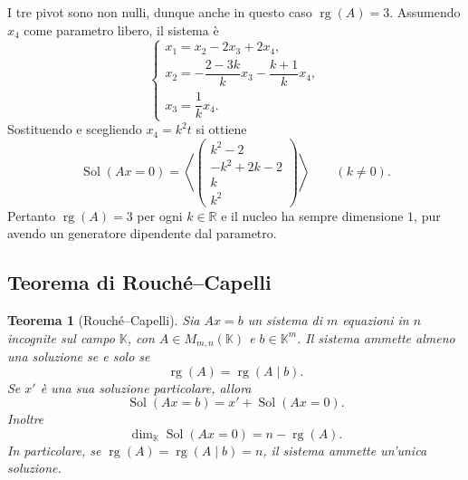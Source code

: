 \documentclass[11pt,a4paper]{article}
\newcommand{\RR}{\mathbb{R}}
\newcommand{\KK}{\mathbb{K}}
\theoremstyle{plain}
\newtheorem{teo}[prop]{Teorema}
\theoremstyle{definition}
\theoremstyle{remark}
\begin{document}
I tre pivot sono non nulli, dunque anche in questo caso $\operatorname{rg}(A)=3$. Assumendo $x_4$ come parametro libero, il sistema è
\[
 \begin{cases}
 x_1=x_2-2x_3+2x_4,\\
 x_2=-\dfrac{2-3k}{k}x_3-\dfrac{k+1}{k}x_4,\\
 x_3=\dfrac1k x_4.
 \end{cases}
\]
Sostituendo e scegliendo $x_4=k^2t$ si ottiene
\[
 \operatorname{Sol}(Ax=0)=\left\langle
 \begin{pmatrix}k^2-2\\-k^2+2k-2\\k\\k^2\end{pmatrix}
 \right\rangle\qquad(k\ne0).
\]
Pertanto $\operatorname{rg}(A)=3$ per ogni $k\in\RR$ e il nucleo ha sempre dimensione $1$, pur avendo un generatore dipendente dal parametro.

\subsection{Teorema di Rouché--Capelli}
\begin{teo}[Rouché--Capelli]
Sia $Ax=b$ un sistema di $m$ equazioni in $n$ incognite sul campo $\KK$, con $A\in M_{m,n}(\KK)$ e $b\in\KK^m$. Il sistema ammette almeno una soluzione se e solo se
\[
 \operatorname{rg}(A)=\operatorname{rg}(A\mid b).
\]
Se $x'$ è una sua soluzione particolare, allora
\[
 \operatorname{Sol}(Ax=b)=x'+\operatorname{Sol}(Ax=0).
\]
Inoltre
\[
 \dim_{\KK}\operatorname{Sol}(Ax=0)=n-\operatorname{rg}(A).
\]
In particolare, se $\operatorname{rg}(A)=\operatorname{rg}(A\mid b)=n$, il sistema ammette un'unica soluzione.
\end{teo}
\end{document}
